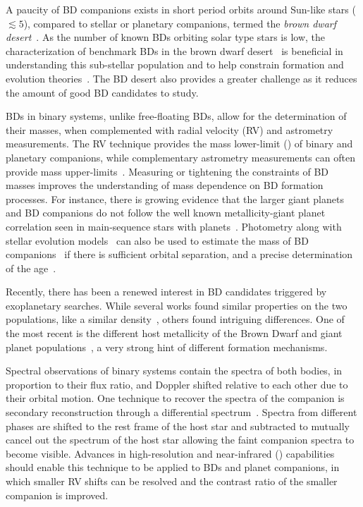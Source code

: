 A paucity of BD companions exists in short period orbits around Sun-like stars (\(\lesssim5 \)\AU), compared to stellar or planetary companions, termed the \emph{brown dwarf desert}~\citep{halbwachs_exploring_2000, zucker_analysis_2001, sahlmann_search_2011}.
As the number of known BDs orbiting solar type stars is low, the characterization of benchmark BDs in the brown dwarf desert~\citep[e.g.][]{crepp_trends_2016} is beneficial in understanding this sub-stellar population and to help constrain formation and evolution theories~\citep{whitworth_formation_2007}.
The BD desert also provides a greater challenge as it reduces the amount of good BD candidates to study.

BDs in binary systems, unlike free-floating BDs, allow for the determination of their masses, when complemented with radial velocity ({RV}) and astrometry measurements.
The {RV} technique provides the mass lower-limit (\mtwosini{}) of binary and planetary companions, while complementary astrometry measurements can often provide mass upper-limits~\citep[e.g.][]{sahlmann_search_2011}.
Measuring or tightening the constraints of BD masses improves the understanding of mass dependence on BD formation processes.
For instance, there is growing evidence that the larger giant planets and BD companions do not follow the well known metallicity-giant planet correlation seen in main-sequence stars with planets~\citep[e.g.][]{santos_spectroscopic_2004,santos_observational_2017, maldonado_searching_2017}.
Photometry along with stellar evolution models~\citep[e.g.][]{baraffe_evolutionary_2003,allard_btsettl_2013} can also be used to estimate the mass of BD companions~\citep[e.g.][]{moutou_eccentricity_2017} if there is sufficient orbital separation, and a precise determination of the age~\citep{soderblom_ages_2010}.

Recently, there has been a renewed interest in BD candidates triggered by exoplanetary searches.
While several works found similar properties on the two populations, like a similar density~\citep{hatzes_definition_2015}, others found intriguing differences.
One of the most recent is the different host metallicity of the Brown Dwarf and giant planet populations~\citep{santos_observational_2017, schlaufman_evidence_2018}, a very strong hint of different formation mechanisms.

Spectral observations of binary systems contain the spectra of both bodies, in proportion to their flux ratio, and Doppler shifted relative to each other due to their orbital motion.
One technique to recover the spectra of the companion is secondary reconstruction through a differential spectrum~\citep{ferluga_separating_1997}.
Spectra from different phases are shifted to the rest frame of the host star and subtracted to mutually cancel out the spectrum of the host star allowing the faint companion spectra to become visible.
Advances in high-resolution and near-infrared (\nir{}) capabilities should enable this technique to be applied to BDs and planet companions, in which smaller {RV} shifts can be resolved and the contrast ratio of the smaller companion is improved.

